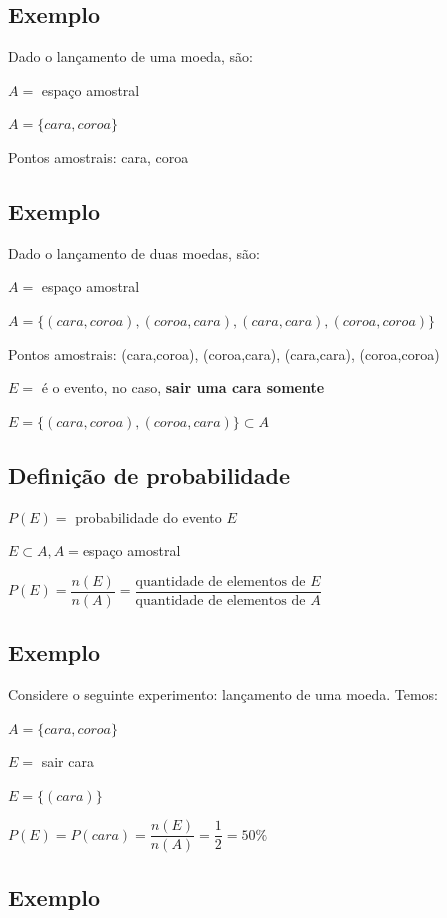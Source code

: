 \documentclass[a4paper]{article}
\begin{document}
	\subsection{Exemplo}
	
	\noindent Dado o lançamento de uma moeda, são:
	
	$A =$ espaço amostral
	
	$A = \{cara,coroa\}$
	
	Pontos amostrais: cara, coroa
	
	\subsection{Exemplo}
	
	\noindent Dado o lançamento de duas moedas, são:
	
	$A =$ espaço amostral
	
	$A = \{(cara,coroa),(coroa,cara),(cara,cara),(coroa,coroa)\}$
	
	Pontos amostrais: (cara,coroa), (coroa,cara), (cara,cara), (coroa,coroa)
	
	$E =$ é o evento, no caso, \textbf{sair uma cara somente}
	
	$E = \{(cara,coroa),(coroa,cara)\} \subset A$
	
	\subsection{Definição de probabilidade}
	
	$P(E) =$ probabilidade do evento $E$
	
	$E \subset A, A = $espaço amostral
	
	$P(E) = \dfrac{n(E)}{n(A)} = \dfrac{\text{quantidade de elementos de $E$}}{\text{quantidade de elementos de $A$}}$
	
	\subsection{Exemplo}
	
	Considere o seguinte experimento: lançamento de uma moeda. Temos:
	
	$A = \{cara,coroa\}$
	
	$E =$ sair cara
	
	$E = \{(cara)\}$
	
	$P(E) = P(cara) = \dfrac{n(E)}{n(A)} = \dfrac{1}{2} = 50\%$
	
	\subsection{Exemplo}
	
\end{document}
